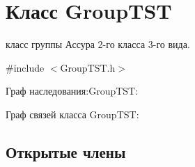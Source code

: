 \hypertarget{class_group_t_s_t}{
\section{Класс GroupTST}
\label{class_group_t_s_t}
}


класс группы Ассура 2-\/го класса 3-\/го вида.  




{\ttfamily \#include $<$GroupTST.h$>$}



Граф наследования:GroupTST:


Граф связей класса GroupTST:
\subsection*{Открытые члены}
